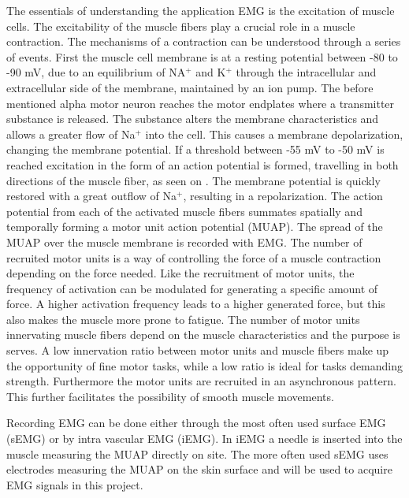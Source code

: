 The essentials of understanding the application EMG is the excitation of muscle cells. The excitability of the muscle fibers play a crucial role in a muscle contraction. The mechanisms of a contraction can be understood through a series of events. First the muscle cell membrane is at a resting potential between -80 to -90 mV, due to an equilibrium of NA$^+$ and K$^+$ through the intracellular and extracellular side of the membrane, maintained by an ion pump. The before mentioned alpha motor neuron reaches the motor endplates where a transmitter substance is released. The substance alters the membrane characteristics and allows a greater flow of Na$^+$ into the cell. This causes a membrane depolarization, changing the membrane potential. If a threshold between -55 mV to -50 mV is reached excitation in the form of an action potential is formed, travelling in both directions of the muscle fiber, as seen on . The membrane potential is quickly restored with a great outflow of Na$^+$, resulting in a repolarization. The action potential from each of the activated muscle fibers summates spatially and temporally forming a motor unit action potential (MUAP). The spread of the MUAP over the muscle membrane is recorded with EMG. The number of recruited motor units is a way of controlling the force of a muscle contraction depending on the force needed. Like the recruitment of motor units, the frequency of activation can be modulated for generating a specific amount of force. A higher activation frequency leads to a higher generated force, but this also makes the muscle more prone to fatigue. The number of motor units innervating muscle fibers depend on the muscle characteristics and the purpose is serves. A low innervation ratio between motor units and muscle fibers make up the opportunity of fine motor tasks, while a low ratio is ideal for tasks demanding strength. Furthermore the motor units are recruited in an asynchronous pattern. This further facilitates the possibility of smooth muscle movements. \cite{Martini2012, Cram2012}

Recording EMG can be done either through the most often used surface EMG (sEMG) or by intra vascular EMG (iEMG). In iEMG a needle is inserted into the muscle measuring the MUAP directly on site. The more often used sEMG uses electrodes measuring the MUAP on the skin surface and will be used to acquire EMG signals in this project. \cite{Cram2012} 
